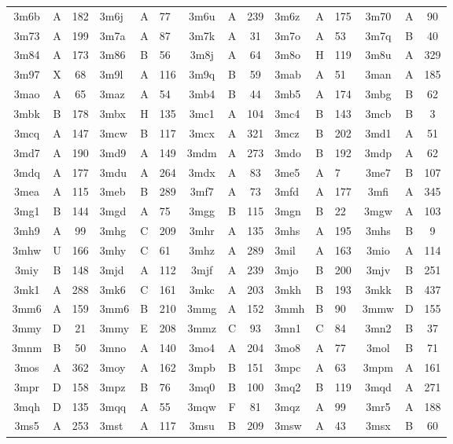 \begin{longtable}{|c|c|c| a|a|a| c|c|c| a|a|a| c|c|c|}
3m6b & A & 182 & 3m6j & A & 77 & 3m6u & A & 239 & 3m6z & A & 175 & 3m70 & A & 90\\
3m73 & A & 199 & 3m7a & A & 87 & 3m7k & A & 31 & 3m7o & A & 53 & 3m7q & B & 40\\
3m84 & A & 173 & 3m86 & B & 56 & 3m8j & A & 64 & 3m8o & H & 119 & 3m8u & A & 329\\
3m97 & X & 68 & 3m9l & A & 116 & 3m9q & B & 59 & 3mab & A & 51 & 3man & A & 185\\
3mao & A & 65 & 3maz & A & 54 & 3mb4 & B & 44 & 3mb5 & A & 174 & 3mbg & B & 62\\
3mbk & B & 178 & 3mbx & H & 135 & 3mc1 & A & 104 & 3mc4 & B & 143 & 3mcb & B & 3\\
3mcq & A & 147 & 3mcw & B & 117 & 3mcx & A & 321 & 3mcz & B & 202 & 3md1 & A & 51\\
3md7 & A & 190 & 3md9 & A & 149 & 3mdm & A & 273 & 3mdo & B & 192 & 3mdp & A & 62\\
3mdq & A & 177 & 3mdu & A & 264 & 3mdx & A & 83 & 3me5 & A & 7 & 3me7 & B & 107\\
3mea & A & 115 & 3meb & B & 289 & 3mf7 & A & 73 & 3mfd & A & 177 & 3mfi & A & 345\\
3mg1 & B & 144 & 3mgd & A & 75 & 3mgg & B & 115 & 3mgn & B & 22 & 3mgw & A & 103\\
3mh9 & A & 99 & 3mhg & C & 209 & 3mhr & A & 135 & 3mhs & A & 195 & 3mhs & B & 9\\
3mhw & U & 166 & 3mhy & C & 61 & 3mhz & A & 289 & 3mil & A & 163 & 3mio & A & 114\\
3miy & B & 148 & 3mjd & A & 112 & 3mjf & A & 239 & 3mjo & B & 200 & 3mjv & B & 251\\
3mk1 & A & 288 & 3mk6 & C & 161 & 3mkc & A & 203 & 3mkh & B & 193 & 3mkk & B & 437\\
3mm6 & A & 159 & 3mm6 & B & 210 & 3mmg & A & 152 & 3mmh & B & 90 & 3mmw & D & 155\\
3mmy & D & 21 & 3mmy & E & 208 & 3mmz & C & 93 & 3mn1 & C & 84 & 3mn2 & B & 37\\
3mnm & B & 50 & 3mno & A & 140 & 3mo4 & A & 204 & 3mo8 & A & 77 & 3mol & B & 71\\
3mos & A & 362 & 3moy & A & 162 & 3mpb & B & 151 & 3mpc & A & 63 & 3mpm & A & 161\\
3mpr & D & 158 & 3mpz & B & 76 & 3mq0 & B & 100 & 3mq2 & B & 119 & 3mqd & A & 271\\
3mqh & D & 135 & 3mqq & A & 55 & 3mqw & F & 81 & 3mqz & A & 99 & 3mr5 & A & 188\\
3ms5 & A & 253 & 3mst & A & 117 & 3msu & B & 209 & 3msw & A & 43 & 3msx & B & 60\\

\end{longtable}
